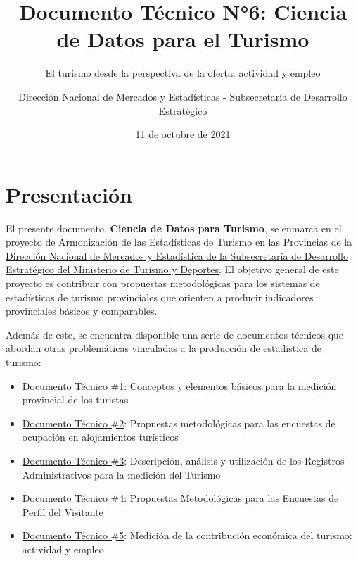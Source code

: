 \documentclass[
  openany]{book}
\title{Documento Técnico N°6: Ciencia de Datos para el Turismo}
\subtitle{El turismo desde la perspectiva de la oferta: actividad y empleo}
\author{Dirección Nacional de Mercados y Estadísticas - Subsecretaría de Desarrollo Estratégico}
\date{11 de octubre de 2021}
\let\oldmaketitle\maketitle
\begin{document}
\maketitle


\newpage

\let\maketitle\oldmaketitle
\maketitle

{
\setcounter{tocdepth}{1}
\tableofcontents
}
\hypertarget{presentaciuxf3n}{%
\chapter*{Presentación}\label{presentaciuxf3n}}

El presente documento, \textbf{Ciencia de Datos para Turismo}, se enmarca en el proyecto de Armonización de las Estadísticas de Turismo en las Provincias de la \href{https://www.yvera.tur.ar/estadistica/}{Dirección Nacional de Mercados y Estadística de la Subsecretaría de Desarrollo Estratégico del Ministerio de Turismo y Deportes}. El objetivo general de este proyecto es contribuir con propuestas metodológicas para los sistemas de estadísticas de turismo provinciales que orienten a producir indicadores provinciales básicos y comparables.

Además de este, se encuentra disponible una serie de documentos técnicos que abordan otras problemáticas vinculadas a la producción de estadística de turismo:

\begin{itemize}
\item
  \href{https://dnme-minturdep.github.io/DT1_medicion_turismo/}{Documento Técnico \#1}: Conceptos y elementos básicos para la medición provincial de los turistas
\item
  \href{https://dnme-minturdep.github.io/DT2_encuestas/}{Documento Técnico \#2}: Propuestas metodológicas para las encuestas de ocupación en alojamientos turísticos
\item
  \href{https://dnme-minturdep.github.io/DT3_registros_adminsitrativos/}{Documento Técnico \#3}: Descripción, análisis y utilización de los Registros Administrativos para la medición del Turismo
\item
  \href{https://dnme-minturdep.github.io/DT4_perfiles/}{Documento Técnico \#4}: Propuestas Metodológicas para las Encuestas de Perfil del Visitante
\item
  \href{https://dnme-minturdep.github.io/DT5_actividad_empleo/}{Documento Técnico \#5}: Medición de la contribución económica del turismo: actividad y empleo
\end{itemize}
\end{document}

